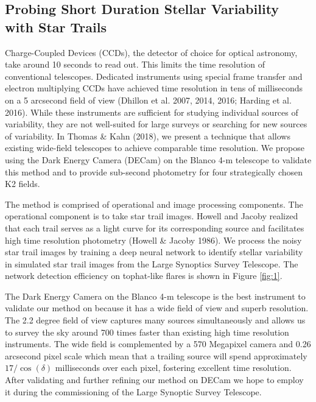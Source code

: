 \documentclass[11pt]{article}
\begin{document}

\subsection*{Probing Short Duration Stellar Variability with Star Trails}

 Charge-Coupled Devices (CCDs), the detector of choice for optical astronomy, take around 10 seconds to read out. This limits the time resolution of conventional telescopes. Dedicated instruments using special frame transfer and electron multiplying CCDs have achieved time resolution in tens of milliseconds on a 5 arcsecond field of view (Dhillon et al. 2007, 2014, 2016; Harding et al. 2016). While these instruments are sufficient for studying individual sources of variability, they are not well-suited for large surveys or searching for new sources of variability. In Thomas \& Kahn (2018), we present a technique that allows existing wide-field telescopes to achieve comparable time resolution. We propose using the Dark Energy Camera (DECam) on the Blanco 4-m telescope to validate this method and to provide sub-second photometry for four strategically chosen K2 fields.

The method is comprised of operational and image processing components. The operational component is to take star trail images. Howell and Jacoby realized that each trail serves as a light curve for its corresponding source and facilitates high time resolution photometry (Howell \& Jacoby 1986). We process the noisy star trail images by training a deep neural network to identify stellar variability in simulated star trail images from the Large Synoptics Survey Telescope. The network detection efficiency on tophat-like flares is shown in Figure \ref{fig:1}. 

The Dark Energy Camera on the Blanco 4-m telescope is the best instrument to validate our method on because it has a wide field of view and superb resolution. The 2.2 degree field of view captures many sources simultaneously and allows us to survey the sky around 700 times faster than existing high time resolution instruments. The wide field is complemented by a 570 Megapixel camera and 0.26 arcsecond pixel scale which mean that a trailing source will spend approximately $17 / \cos(\delta)$ milliseconds over each pixel, fostering excellent time resolution. After validating and further refining our method on DECam we hope to employ it during the commissioning of the Large Synoptic Survey Telescope. 
\end{document}
